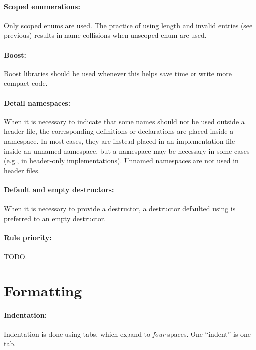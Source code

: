 \documentclass[footinclude=false,11pt,DIV11]{scrartcl}
\begin{document}
\paragraph{Scoped enumerations:} Only scoped enums are used. The practice of 
using length and invalid entries (see previous) results in name collisions when 
unscoped enum are used.

\paragraph{Boost:} Boost libraries should be used whenever this helps save time 
or write more compact code.

\paragraph{Detail namespaces:} When it is necessary to indicate that some names 
should not be used outside a header file, the corresponding definitions or 
declarations are placed inside a  namespace. In most cases, they 
are instead placed in an implementation file inside an unnamed namespace, but a 
 namespace may be necessary in some cases (e.g., in header-only 
implementations). Unnamed namespaces are not used in header files.

\paragraph{Default and empty destructors:} When it is necessary to provide a 
destructor, a destructor defaulted using  is preferred to an 
empty destructor.

\paragraph{Rule priority:} TODO.

\section{Formatting}

\paragraph{Indentation:} Indentation is done using tabs, which expand to 
\emph{four} spaces. One ``indent'' is one tab.
\end{document}
